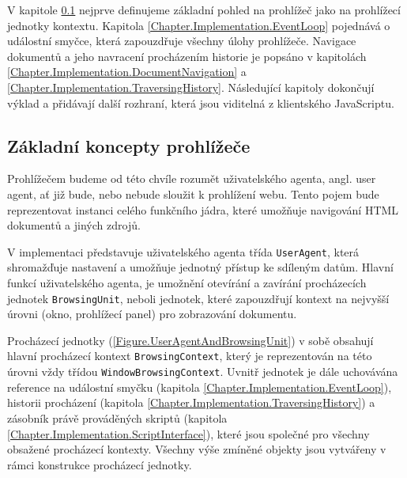 V kapitole \ref{Chapter.Implementation.BasicConcepts} nejprve definujeme základní pohled na prohlížeč jako na prohlížecí jednotky kontextu. Kapitola \ref{Chapter.Implementation.EventLoop} pojednává o událostní smyčce, která zapouzdřuje všechny úlohy prohlížeče. Navigace dokumentů a jeho navracení procházením historie je popsáno v kapitolách \ref{Chapter.Implementation.DocumentNavigation} a \ref{Chapter.Implementation.TraversingHistory}. Následující kapitoly dokončují výklad a přidávají další rozhraní, která jsou viditelná z klientského JavaScriptu. 

\subsection{Základní koncepty prohlížeče}
\label{Chapter.Implementation.BasicConcepts}

Prohlížečem budeme od této chvíle rozumět uživatelského agenta, angl. user agent, ať již bude, nebo nebude sloužit k prohlížení webu. Tento pojem bude reprezentovat instanci celého funkčního jádra, které umožňuje navigování HTML dokumentů a jiných zdrojů.

V implementaci představuje uživatelského agenta třída \texttt{UserAgent}, která shromažďuje nastavení a umožňuje jednotný přístup ke sdíleným datům. Hlavní funkcí uživatelského agenta, je umožnění otevírání a zavírání procházecích jednotek \texttt{BrowsingUnit}, neboli jednotek, které zapouzdřují kontext na nejvyšší úrovni (okno, prohlížecí panel) pro zobrazování dokumentu. 

Procházecí jednotky (\ref{Figure.UserAgentAndBrowsingUnit}) v sobě obsahují hlavní procházecí kontext \texttt{BrowsingContext}, který je reprezentován na této úrovni vždy třídou \texttt{WindowBrowsingContext}. Uvnitř jednotek je dále uchovávána reference na událostní smyčku (kapitola \ref{Chapter.Implementation.EventLoop}), historii procházení (kapitola \ref{Chapter.Implementation.TraversingHistory}) a zásobník právě prováděných skriptů (kapitola \ref{Chapter.Implementation.ScriptInterface}), které jsou společné pro všechny obsažené procházecí kontexty. Všechny výše zmíněné objekty jsou vytvářeny v rámci konstrukce procházecí jednotky.

